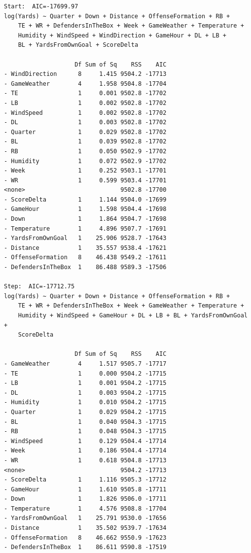 \documentclass[
  super,
  preprint,
  3p]{elsarticle}
\begin{document}
\begin{verbatim}
Start:  AIC=-17699.97
log(Yards) ~ Quarter + Down + Distance + OffenseFormation + RB + 
    TE + WR + DefendersInTheBox + Week + GameWeather + Temperature + 
    Humidity + WindSpeed + WindDirection + GameHour + DL + LB + 
    BL + YardsFromOwnGoal + ScoreDelta

                    Df Sum of Sq    RSS    AIC
- WindDirection      8     1.415 9504.2 -17713
- GameWeather        4     1.958 9504.8 -17704
- TE                 1     0.001 9502.8 -17702
- LB                 1     0.002 9502.8 -17702
- WindSpeed          1     0.002 9502.8 -17702
- DL                 1     0.003 9502.8 -17702
- Quarter            1     0.029 9502.8 -17702
- BL                 1     0.039 9502.8 -17702
- RB                 1     0.050 9502.9 -17702
- Humidity           1     0.072 9502.9 -17702
- Week               1     0.252 9503.1 -17701
- WR                 1     0.599 9503.4 -17701
<none>                           9502.8 -17700
- ScoreDelta         1     1.144 9504.0 -17699
- GameHour           1     1.598 9504.4 -17698
- Down               1     1.864 9504.7 -17698
- Temperature        1     4.896 9507.7 -17691
- YardsFromOwnGoal   1    25.906 9528.7 -17643
- Distance           1    35.557 9538.4 -17621
- OffenseFormation   8    46.438 9549.2 -17611
- DefendersInTheBox  1    86.488 9589.3 -17506

Step:  AIC=-17712.75
log(Yards) ~ Quarter + Down + Distance + OffenseFormation + RB + 
    TE + WR + DefendersInTheBox + Week + GameWeather + Temperature + 
    Humidity + WindSpeed + GameHour + DL + LB + BL + YardsFromOwnGoal + 
    ScoreDelta

                    Df Sum of Sq    RSS    AIC
- GameWeather        4     1.517 9505.7 -17717
- TE                 1     0.000 9504.2 -17715
- LB                 1     0.001 9504.2 -17715
- DL                 1     0.003 9504.2 -17715
- Humidity           1     0.010 9504.2 -17715
- Quarter            1     0.029 9504.2 -17715
- BL                 1     0.040 9504.3 -17715
- RB                 1     0.048 9504.3 -17715
- WindSpeed          1     0.129 9504.4 -17714
- Week               1     0.186 9504.4 -17714
- WR                 1     0.618 9504.8 -17713
<none>                           9504.2 -17713
- ScoreDelta         1     1.116 9505.3 -17712
- GameHour           1     1.610 9505.8 -17711
- Down               1     1.826 9506.0 -17711
- Temperature        1     4.576 9508.8 -17704
- YardsFromOwnGoal   1    25.791 9530.0 -17656
- Distance           1    35.502 9539.7 -17634
- OffenseFormation   8    46.662 9550.9 -17623
- DefendersInTheBox  1    86.611 9590.8 -17519


\end{verbatim}
\end{document}
